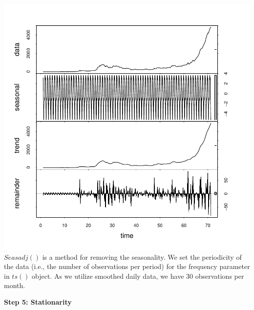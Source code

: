 \documentclass{article}
\begin{document}
\begin{Schunk}
\end{Schunk}
\includegraphics{Report-012}
$Seasadj()$ is a method for removing the seasonality. We set the periodicity of the data (i.e., the number of observations per period) for the frequency parameter in $ts()$ object. As we utilize smoothed daily data, we have 30 observations per month.

\textbf{Step 5: Stationarity}
\end{document}
